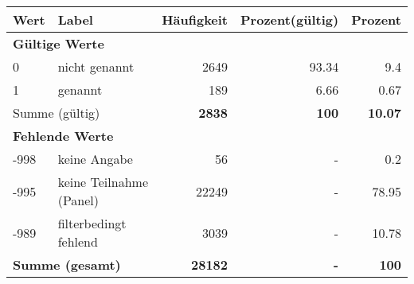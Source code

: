      \begin{longtable}{lXrrr}
     \toprule
     \textbf{Wert} & \textbf{Label} & \textbf{Häufigkeit} & \textbf{Prozent(gültig)} & \textbf{Prozent} \\
     \endhead
     \midrule
     \multicolumn{5}{l}{\textbf{Gültige Werte}}\\

     0 &
     \multicolumn{1}{X}{ nicht genannt   } &


       \num{2649} &
       \num[round-mode=places,round-precision=2]{93,34} &
         \num[round-mode=places,round-precision=2]{9,4} \\

     1 &
     \multicolumn{1}{X}{ genannt   } &


       \num{189} &
       \num[round-mode=places,round-precision=2]{6,66} &
         \num[round-mode=places,round-precision=2]{0,67} \\
     \midrule
     \multicolumn{2}{l}{Summe (gültig)} &
       \textbf{\num{2838}} &
     \textbf{100} &
       \textbf{\num[round-mode=places,round-precision=2]{10,07}} \\
     \multicolumn{5}{l}{\textbf{Fehlende Werte}}\\
       -998 &
       keine Angabe &
         \num{56} &
        - &
         \num[round-mode=places,round-precision=2]{0,2} \\
       -995 &
       keine Teilnahme (Panel) &
         \num{22249} &
        - &
         \num[round-mode=places,round-precision=2]{78,95} \\
       -989 &
       filterbedingt fehlend &
         \num{3039} &
        - &
         \num[round-mode=places,round-precision=2]{10,78} \\
     \midrule
     \multicolumn{2}{l}{\textbf{Summe (gesamt)}} &
          \textbf{\num{28182}} &
        \textbf{-} &
        \textbf{100} \\
     \bottomrule
     \end{longtable}
     
